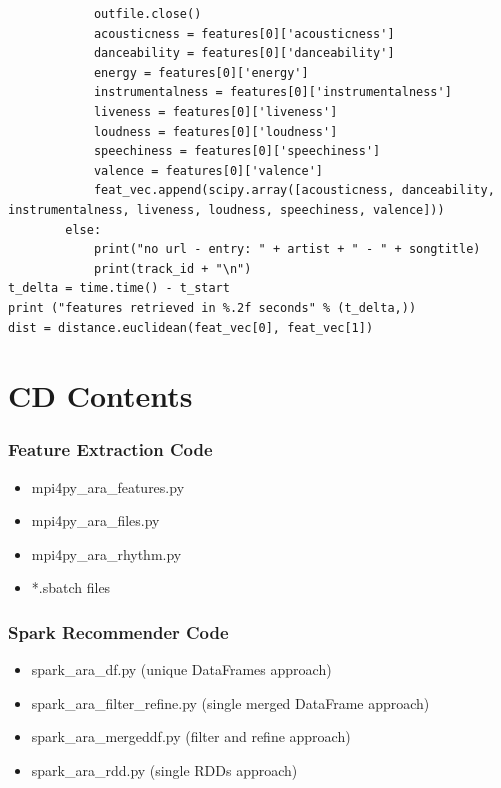 \documentclass[a4paper,oneside,12pt]{report}
\begin{document}
\begin{lstlisting}
			outfile.close()    
			acousticness = features[0]['acousticness']
			danceability = features[0]['danceability']
			energy = features[0]['energy']
			instrumentalness = features[0]['instrumentalness']
			liveness = features[0]['liveness']
			loudness = features[0]['loudness']
			speechiness = features[0]['speechiness']
			valence = features[0]['valence']
			feat_vec.append(scipy.array([acousticness, danceability, instrumentalness, liveness, loudness, speechiness, valence]))	
		else: 
			print("no url - entry: " + artist + " - " + songtitle)
			print(track_id + "\n")
t_delta = time.time() - t_start
print ("features retrieved in %.2f seconds" % (t_delta,))   
dist = distance.euclidean(feat_vec[0], feat_vec[1])
\end{lstlisting}



\section{CD Contents}\label{DVD}

\subsubsection{Feature Extraction Code}

\begin{itemize}
	\setlength\itemsep{-0.5em}
	\item mpi4py\_ara\_features.py
	\item mpi4py\_ara\_files.py
	\item mpi4py\_ara\_rhythm.py
	\item *.sbatch files
\end{itemize}

\subsubsection{Spark Recommender Code}

\begin{itemize}
	\setlength\itemsep{-0.5em}
	\item spark\_ara\_df.py	(unique DataFrames approach)
	\item spark\_ara\_filter\_refine.py (single merged DataFrame approach)
	\item spark\_ara\_mergeddf.py (filter and refine approach)
	\item spark\_ara\_rdd.py (single RDDs approach)
\end{itemize}
\end{document}
